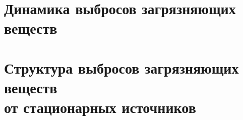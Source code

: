 







\section{Динамика выбросов загрязняющих веществ}
\begin{frame}{\insertsectionhead}
\end{frame}

\section{Структура выбросов загрязняющих веществ \\ от
стационарных источников}
\begin{frame}{\insertsectionhead}
\end{frame}










